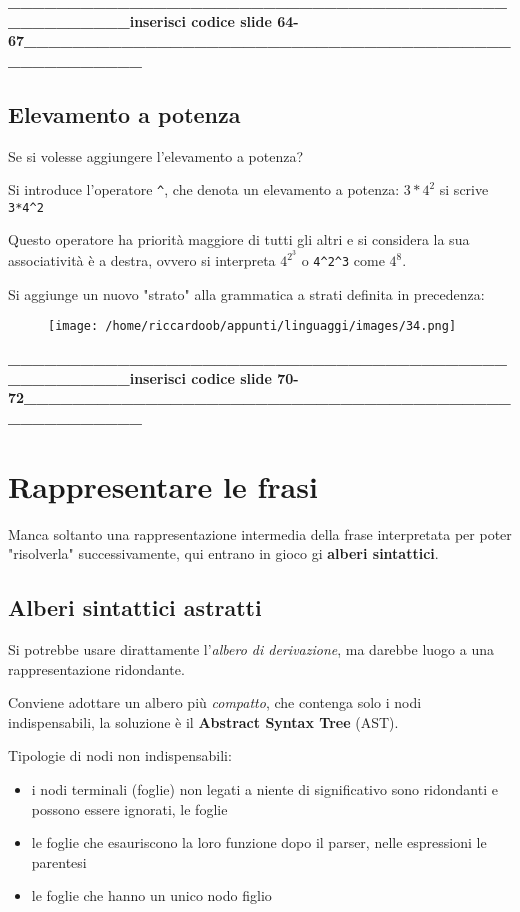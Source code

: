 \textbf{\_\_\_\_\_\_\_\_\_\_\_\_\_\_\_\_\_\_\_\_\_\_\_\_\_\_\_\_\_\_\_\_\_\_\_\_\_\_\_\_\_\_\_\_\_\_\_\_\_\_\_inserisci codice slide 64-67\_\_\_\_\_\_\_\_\_\_\_\_\_\_\_\_\_\_\_\_\_\_\_\_\_\_\_\_\_\_\_\_\_\_\_\_\_\_\_\_\_\_\_\_\_\_\_\_\_\_\_}
\subsection{Elevamento a potenza}
Se si volesse aggiungere l'elevamento a potenza?

Si introduce l'operatore \texttt{\^}, che denota un elevamento a potenza: $3*4^2$ si scrive \texttt{3*4\^{}2} 

Questo operatore ha priorità maggiore di tutti gli altri e si considera la sua associatività è a destra, ovvero si interpreta $4^{2^3}$ o \texttt{4\^{}2\^{}3} come $4^8$.

Si aggiunge un nuovo "strato" alla grammatica a strati definita in precedenza:
\begin{figure}[H]
    \centering
    \texttt{[image: /home/riccardoob/appunti/linguaggi/images/34.png]}
\end{figure}

\textbf{\_\_\_\_\_\_\_\_\_\_\_\_\_\_\_\_\_\_\_\_\_\_\_\_\_\_\_\_\_\_\_\_\_\_\_\_\_\_\_\_\_\_\_\_\_\_\_\_\_\_\_inserisci codice slide 70-72\_\_\_\_\_\_\_\_\_\_\_\_\_\_\_\_\_\_\_\_\_\_\_\_\_\_\_\_\_\_\_\_\_\_\_\_\_\_\_\_\_\_\_\_\_\_\_\_\_\_\_}

\section{Rappresentare le frasi}
Manca soltanto una rappresentazione intermedia della frase interpretata per poter "risolverla" successivamente, qui entrano in gioco gi \textbf{alberi sintattici}.

\subsection{Alberi sintattici astratti}
Si potrebbe usare dirattamente l'\textit{albero di derivazione}, ma darebbe luogo a una rappresentazione ridondante.

Conviene adottare un albero più \textit{compatto}, che contenga solo i nodi indispensabili, la soluzione è il \textbf{Abstract Syntax Tree} (AST).

Tipologie di nodi non indispensabili:
\begin{itemize}
    \item i nodi terminali (foglie) non legati a niente di significativo sono ridondanti e possono essere ignorati, le foglie 
    \item le foglie che esauriscono la loro funzione dopo il parser, nelle espressioni le parentesi
    \item le foglie che hanno un unico nodo figlio
\end{itemize}

